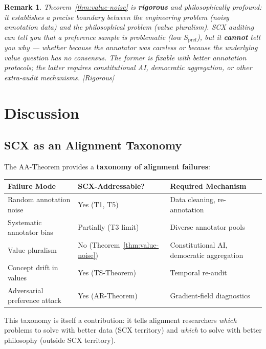 \documentclass[12pt,a4paper]{article}
\newtheorem{remark}[theorem]{Remark}
\newcommand{\rigorous}{\textcolor{green!50!black}{\small\textsf{[Rigorous]}}}
\begin{document}
\begin{remark}
Theorem~\ref{thm:value-noise} is \textbf{rigorous} and philosophically profound:
it establishes a precise boundary between the engineering problem (noisy
annotation data) and the philosophical problem (value pluralism).  SCX auditing
can tell you \emph{that} a preference sample is problematic (low
$S_{\mathrm{pref}}$), but it \textbf{cannot} tell you \emph{why} — whether
because the annotator was careless or because the underlying value question has
no consensus.  The former is fixable with better annotation protocols;
the latter requires constitutional AI, democratic aggregation, or other
extra-audit mechanisms.  \rigorous
\end{remark}

\section{Discussion}

\subsection{SCX as an Alignment Taxonomy}

The AA-Theorem provides a \textbf{taxonomy of alignment failures}:

\begin{center}
\begin{tabular}{@{}lll@{}}
\toprule
\textbf{Failure Mode} & \textbf{SCX-Addressable?} & \textbf{Required Mechanism} \\
\midrule
Random annotation noise       & Yes (T1, T5)       & Data cleaning, re-annotation \\
Systematic annotator bias     & Partially (T3 limit) & Diverse annotator pools \\
Value pluralism               & No (Theorem~\ref{thm:value-noise}) & Constitutional AI, democratic aggregation \\
Concept drift in values       & Yes (TS-Theorem)   & Temporal re-audit \\
Adversarial preference attack & Yes (AR-Theorem)   & Gradient-field diagnostics \\
\bottomrule
\end{tabular}
\end{center}

This taxonomy is itself a contribution: it tells alignment researchers
\emph{which} problems to solve with better data (SCX territory) and
\emph{which} to solve with better philosophy (outside SCX territory).
\end{document}
